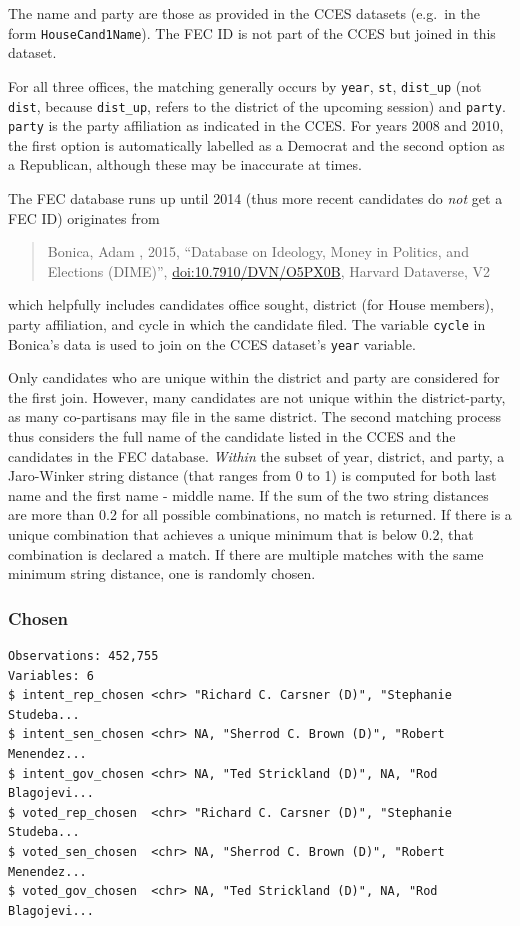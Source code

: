 \documentclass[10pt,article,oneside]{memoir}
\theoremstyle{definition}
\begin{document}
The name and party are those as provided in the CCES datasets (e.g.~in
the form \texttt{HouseCand1Name}). The FEC ID is not part of the CCES
but joined in this dataset.

For all three offices, the matching generally occurs by \texttt{year},
\texttt{st}, \texttt{dist\_up} (not \texttt{dist}, because
\texttt{dist\_up}, refers to the district of the upcoming session) and
\texttt{party}. \texttt{party} is the party affiliation as indicated in
the CCES. For years 2008 and 2010, the first option is automatically
labelled as a Democrat and the second option as a Republican, although
these may be inaccurate at times.

The FEC database runs up until 2014 (thus more recent candidates do
\emph{not} get a FEC ID) originates from

\begin{quote}
Bonica, Adam , 2015, ``Database on Ideology, Money in Politics, and
Elections (DIME)'', \url{doi:10.7910/DVN/O5PX0B}, Harvard Dataverse, V2
\end{quote}

which helpfully includes candidates office sought, district (for House
members), party affiliation, and cycle in which the candidate filed. The
variable \texttt{cycle} in Bonica's data is used to join on the CCES
dataset's \texttt{year} variable.

Only candidates who are unique within the district and party are
considered for the first join. However, many candidates are not unique
within the district-party, as many co-partisans may file in the same
district. The second matching process thus considers the full name of
the candidate listed in the CCES and the candidates in the FEC database.
\emph{Within} the subset of year, district, and party, a Jaro-Winker
string distance (that ranges from 0 to 1) is computed for both last name
and the first name - middle name. If the sum of the two string distances
are more than 0.2 for all possible combinations, no match is returned.
If there is a unique combination that achieves a unique minimum that is
below 0.2, that combination is declared a match. If there are multiple
matches with the same minimum string distance, one is randomly chosen.

\hypertarget{chosen}{%
\subsubsection{Chosen}\label{chosen}}

\begin{verbatim}
Observations: 452,755
Variables: 6
$ intent_rep_chosen <chr> "Richard C. Carsner (D)", "Stephanie Studeba...
$ intent_sen_chosen <chr> NA, "Sherrod C. Brown (D)", "Robert Menendez...
$ intent_gov_chosen <chr> NA, "Ted Strickland (D)", NA, "Rod Blagojevi...
$ voted_rep_chosen  <chr> "Richard C. Carsner (D)", "Stephanie Studeba...
$ voted_sen_chosen  <chr> NA, "Sherrod C. Brown (D)", "Robert Menendez...
$ voted_gov_chosen  <chr> NA, "Ted Strickland (D)", NA, "Rod Blagojevi...
\end{verbatim}
\end{document}
